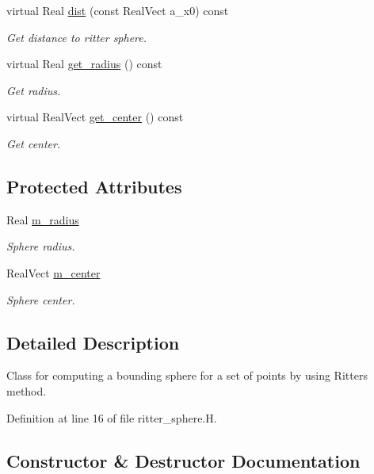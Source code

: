 \begin{DoxyCompactItemize}
virtual Real \hyperlink{classritter__sphere_a0be98dccba8784d4c560cb0db16b20e5}{dist} (const Real\+Vect a\+\_\+x0) const 
\begin{DoxyCompactList}\small\item\em Get distance to ritter sphere. \end{DoxyCompactList}\item 
virtual Real \hyperlink{classritter__sphere_a08be8f56b80831cf88bb773420d136fe}{get\+\_\+radius} () const 
\begin{DoxyCompactList}\small\item\em Get radius. \end{DoxyCompactList}\item 
virtual Real\+Vect \hyperlink{classritter__sphere_a5b95f0cc2ab11a83e6f40866b546bf23}{get\+\_\+center} () const 
\begin{DoxyCompactList}\small\item\em Get center. \end{DoxyCompactList}\end{DoxyCompactItemize}
\subsection*{Protected Attributes}
\begin{DoxyCompactItemize}
\item 
Real \hyperlink{classritter__sphere_aaa41c5c6522dfa56645c41533c44fa0b}{m\+\_\+radius}
\begin{DoxyCompactList}\small\item\em Sphere radius. \end{DoxyCompactList}\item 
Real\+Vect \hyperlink{classritter__sphere_a76b2e62d3889ba21e9e60e42873d4151}{m\+\_\+center}
\begin{DoxyCompactList}\small\item\em Sphere center. \end{DoxyCompactList}\end{DoxyCompactItemize}


\subsection{Detailed Description}
Class for computing a bounding sphere for a set of points by using Ritter\textquotesingle{}s method. 

Definition at line 16 of file ritter\+\_\+sphere.\+H.



\subsection{Constructor \& Destructor Documentation}
